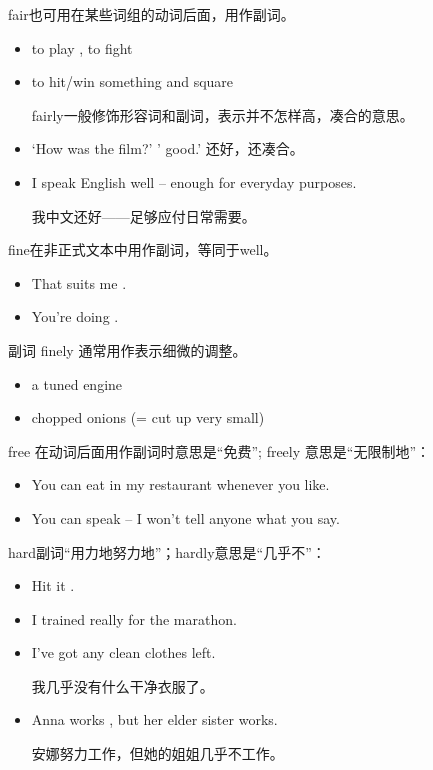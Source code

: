 fair也可用在某些词组的动词后面，用作副词。
\begin{itemize}
\item to play , to fight 
\item to hit/win something  and square

  fairly一般修饰形容词和副词，表示并不怎样高，凑合的意思。

\item `How was the film?' ' good.' 还好，还凑合。

\item I speak English  well -- enough for everyday purposes.

  我中文还好——足够应付日常需要。
\end{itemize}


fine在非正式文本中用作副词，等同于well。
\begin{itemize}
\item That suits me .

\item You're doing .
\end{itemize}
副词 finely 通常用作表示细微的调整。
\begin{itemize}
\item a  tuned engine

\item {} chopped onions (= cut up very small)
\end{itemize}

free 在动词后面用作副词时意思是“免费”; freely 意思是“无限制地”：
\begin{itemize}
\item You can eat  in my restaurant whenever you like.

\item You can speak  – I won't tell anyone what you say.
\end{itemize}

hard副词“用力地努力地”；hardly意思是“几乎不”：
\begin{itemize}
\item Hit it .
\item I trained really  for the marathon.
\item I've  got any clean clothes left.

  我几乎没有什么干净衣服了。
\item Anna works , but her elder sister  works.

  安娜努力工作，但她的姐姐几乎不工作。
\end{itemize}

